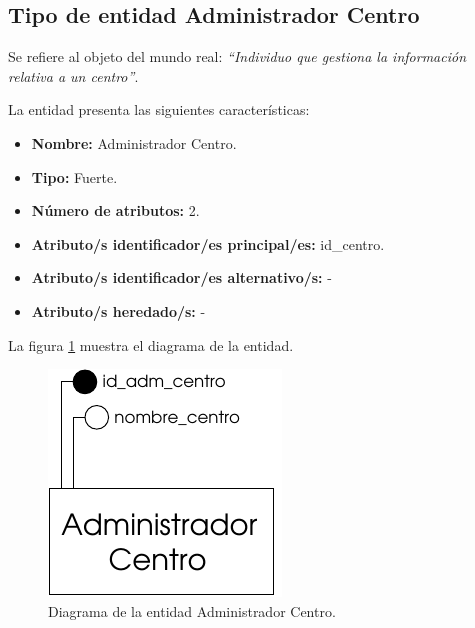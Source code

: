 \subsection{Tipo de entidad Administrador Centro}

   \begin{description}

   \item[Definición] Se refiere al objeto del mundo real: \emph{``Individuo que
    gestiona la información relativa a un centro''}.

   \item[Características] La entidad presenta las siguientes características:
      \begin{itemize}
         \item \textbf{Nombre:} Administrador Centro.
         \item \textbf{Tipo:} Fuerte.
         \item \textbf{Número de atributos:} 2.
         \item \textbf{Atributo/s identificador/es principal/es:} id\_centro.
         \item \textbf{Atributo/s identificador/es alternativo/s:} -
         \item \textbf{Atributo/s heredado/s:} -
      \end{itemize}

   \item[Diagrama] La figura \ref{diagramaAdminCentro} muestra el diagrama de la entidad.
   \item \begin{figure}[!ht]
            \begin{center}
            \includegraphics[]{07.Modelo_Entidad-Interrelacion/7.2.Analisis_Entidades/diagramas/adm_centro.pdf}
            \caption{Diagrama de la entidad Administrador Centro.}
            \label{diagramaAdminCentro}
            \end{center}
         \end{figure}


\end{description}
